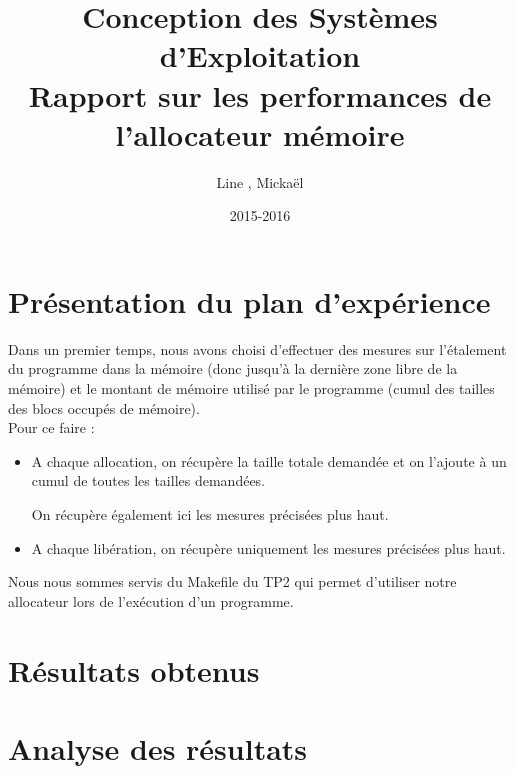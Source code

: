 \documentclass{article}
\title{Conception des Systèmes d'Exploitation\\Rapport sur les performances de l'allocateur mémoire}
\author{Line \bsc{POUVARET}, Mickaël \bsc{TURNEL}}
\date{2015-2016}
\begin{document}
\maketitle
\section{Présentation du plan d'expérience}
Dans un premier temps, nous avons choisi d'effectuer des mesures sur l'étalement du programme dans la mémoire (donc jusqu'à la dernière zone libre de la mémoire) et le montant de mémoire utilisé par le programme (cumul des tailles des blocs occupés de mémoire).\\

Pour ce faire :
\begin{itemize}
\item A chaque allocation, on récupère la taille totale demandée et on l'ajoute à un cumul de toutes les tailles demandées.

On récupère également ici les mesures précisées plus haut.

\item A chaque libération, on récupère uniquement les mesures précisées plus haut.
\end{itemize}

Nous nous sommes servis du Makefile du TP2 qui permet d'utiliser notre allocateur lors de l'exécution d'un programme.\\


\section{Résultats obtenus}
 
\section{Analyse des résultats}
\end{document}

